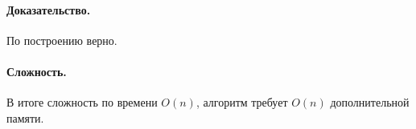\documentclass[12pt]{article}
\begin{document}
\paragraph{Доказательство.}
По построению верно.


\paragraph{Сложность.}
В итоге сложность по времени $ O(n) $, алгоритм требует $ O(n) $ дополнительной памяти.
\end{document}
